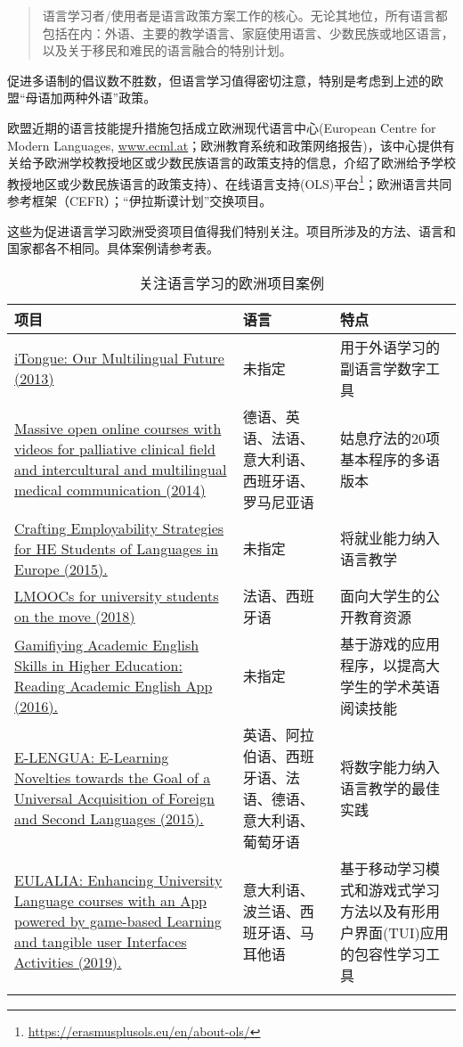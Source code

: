 \documentclass[output=paper]{langscibook}
\begin{document}
\begin{quote}语言学习者/使用者是语言政策方案工作的核心。‌无论其地位，所有语言都包括在内：外语、主要的教学语言、家庭使用语言、少数民族或地区语言，以及关于移民和难民的语言融合的特别计划。\end{quote}

\hspace*{-1mm}促进多语制的倡议数不胜数，但语言学习值得密切注意，特别是考虑到上述的欧盟“母语加两种外语”政策。

欧盟近期的语言技能提升措施包括成立欧洲现代语言中心(European Centre for Modern Languages, \url{www.ecml.at}；欧洲教育系统和政策网络报告\citep{Eurydice2019})，该中心提供有关给予欧洲学校教授地区或少数民族语言的政策支持的信息，介绍了欧洲给予学校教授地区或少数民族语言的政策支持）、在线语言支持(OLS)平台\footnote{\url{https://erasmusplusols.eu/en/about-ols/}}；欧洲语言共同参考框架（CEFR）；“伊拉斯谟计划”交换项目。

这些为促进语言学习欧洲受资项目值得我们特别关注。项目所涉及的方法、语言和国家都各不相同。具体案例请参考表。


\begin{table}
\small
\begin{tabularx}{\textwidth}{Qp{2.5cm}Q}
\lsptoprule
{项目} & {语言} & {特点}\\
\midrule
\href{https://www.itongue.eu/}{{iTongue: Our Multilingual Future (2013)}} & 未指定 & 用于外语学习的副语言学数字工具\\
\tablevspace
\href{http://medlang.eu/videos.php}{{Massive open online courses with videos for palliative clinical field and intercultural and multilingual medical communication (2014)}} & 德语、英语、法语、意大利语、西班牙语、罗马尼亚语 & 姑息疗法的20项基本程序的多语版本\\
\tablevspace
\href{https://languages4work.eu/}{{Crafting Employability Strategies for HE Students of Languages in Europe (2015).}} & 未指定 & 将就业能力纳入语言教学\\
\tablevspace
\href{http://www.mooc2move.eu/}{{LMOOCs for university students on the move (2018)}} & 法语、西班牙语 & 面向大学生的公开教育资源\\
\tablevspace
\href{http://stratapp.eu/}{{Gamifiying Academic English Skills in Higher Education: Reading Academic English App (2016).}} & 未指定 & 基于游戏的应用程序，以提高大学生的学术英语阅读技能\\
\tablevspace
\href{http://elengua.usal.es/}{{E-LENGUA: E-Learning Novelties towards the Goal of a Universal Acquisition of Foreign and Second Languages (2015).}} & 英语、阿拉伯语、西班牙语、法语、德语、意大利语、葡萄牙语 & 将数字能力纳入语言教学的最佳实践\\
\tablevspace
\href{https://eulaliaproject.eu/es/}{{EULALIA: Enhancing University Language courses with an App powered by game-based Learning and tangible user Interfaces Activities (2019).}} & 意大利语、波兰语、西班牙语、马耳他语 & 基于移动学习模式和游戏式学习方法以及有形用户界面(TUI)应用的包容性学习工具\\
\tablevspace
\lspbottomrule
\end{tabularx}
\caption{‌关注语言学习的欧洲项目案例}
\label{tab:torres:2}
\end{table}
\end{document}
